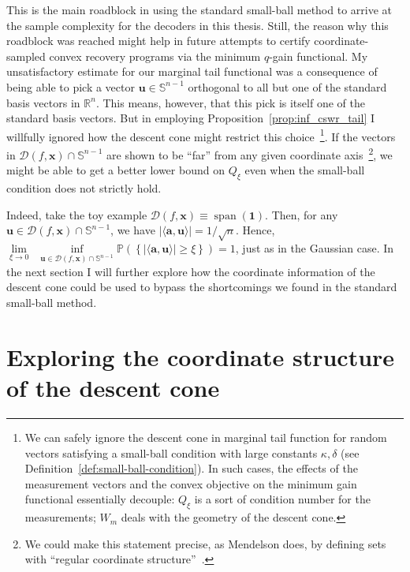 This is the main roadblock in using the standard small-ball method to arrive at the sample complexity for the decoders in this thesis. Still, the reason why this roadblock was reached might help in future attempts to certify coordinate-sampled convex recovery programs via the minimum $q$-gain functional. My unsatisfactory estimate for our marginal tail functional was a consequence of being able to pick a vector $\mathbf{u} \in \mathbb{S}^{n-1}$ orthogonal to all but one of the standard basis vectors in $\mathbb{R}^{n}$. This means, however, that this pick is itself one of the standard basis vectors. But in employing Proposition~\ref{prop:inf_cswr_tail} I willfully ignored how the descent cone might restrict this choice~\footnote{We can safely ignore the descent cone in marginal tail function for random vectors satisfying a small-ball condition with large constants $\kappa, \delta$ (see Definition~\ref{def:small-ball-condition}). In such cases, the effects of the measurement vectors and the convex objective on the minimum gain functional essentially decouple: $Q_\xi$ is a sort of condition number for the measurements; $W_m$ deals with the geometry of the descent cone.}. If the vectors in $\mathcal{D}(f, \mathbf{x}) \cap \mathbb{S}^{n-1}$ are shown to be ``far'' from any given coordinate axis~\footnote{We could make this statement precise, as Mendelson does, by defining sets with ``regular coordinate structure''~\cite{mendelson2018a}.}, we might be able to get a better lower bound on $Q_{\xi}$ even when the small-ball condition does not strictly hold.

Indeed, take the toy example $\mathcal{D}(f, \mathbf{x}) \equiv \operatorname{span} \left ( \mathbf{1} \right )$. Then, for any $\mathbf{u} \in \mathcal{D}(f, \mathbf{x}) \cap \mathbb{S}^{n-1}$, we have $| \langle \mathbf{a}, \mathbf{u}\rangle | = 1/\sqrt{n}$. Hence, $\underset{\xi \to 0}{\lim} \enspace \underset{\mathbf{u} \in \mathcal{D}(f, \mathbf{x}) \cap \mathbb{S}^{n-1}}{\inf} \mathbb{P} \left ( \left \{ | \langle \mathbf{a}, \mathbf{u}\rangle | \geq \xi \right \} \right ) = 1$, just as in the Gaussian case. In the next section I will further explore how the coordinate information of the descent cone could be used to bypass the shortcomings we found in the standard small-ball method.


\section{Exploring the coordinate structure of the descent cone}

